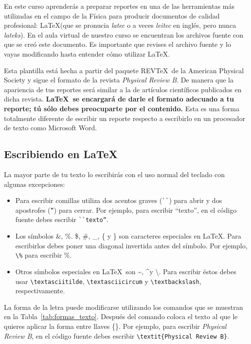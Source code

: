 \documentclass[aps,prb,twocolumn, amsmath, amssymb]{revtex4-2}
\begin{document}
En este curso aprenderás a preparar reportes en una de las herramientas más utilizadas en el campo de la Física para producir documentos de calidad profesional: \LaTeX (que se pronucia \textit{latec} o a veces \textit{leitec} en inglés, pero nunca \textit{lateks}). En el aula virtual de nuestro curso se encuentran los archivos fuente con que se creó este documento. Es importante que revises el archivo fuente y lo vayas modificando hasta entender cómo utilizar \LaTeX.

Esta plantilla está hecha a partir del paquete REV\TeX\ de la American Physical Society y sigue el formato de la revista \textit{Physical Review B}. De manera que la apariencia de tus reportes será similar a la de artículos científicos publicados en dicha revista. \textbf{\LaTeX\ se encargará de darle el formato adecuado a tu reporte; tú sólo debes preocuparte por el contenido.} Esta es una forma totalmente diferente de escribir un reporte respecto a escribirlo en un procesador de texto como Microsoft Word.

\subsection{\label{sec:latex}Escribiendo en \LaTeX}
La mayor parte de tu texto lo escribirás con el uso normal del teclado con algunas excepciones:

\begin{itemize}
	\item Para escribir comillas utiliza dos acentos graves (\texttt{\`}\texttt{\`}) 
	para abrir y dos apostrofes (\texttt{''}) 
	para cerrar. Por ejemplo, para escribir ``texto'', en el código fuente debes escribir \texttt{\`}\texttt{\`}\texttt{texto''}.
	\item Los símbolos \&, \%. \$, \#, \_, \{ y \} 
	son caracteres especiales en \LaTeX. Para escribirlos debes poner una diagonal invertida antes del símbolo. Por ejemplo, \verb|\%| para escribir \%.
	\item Otros símbolos especiales en \LaTeX\ son \textasciitilde, \textasciicircum \space y \textbackslash. Para escribir éstos debes usar \verb|\textasciitilde|, \verb|\textasciicircum| y \verb|\textbackslash|, respectivamente.
\end{itemize}

La forma de la letra puede modificarse utilizando los comandos que se muestran en la Tabla~\ref{tab:formas_texto}. Después del comando coloca el texto al que le quieres aplicar la forma entre llaves \{\}. Por ejemplo, para escribir \textit{Physical Review B}, en el código fuente debes escribir \verb|\textit{Physical Review B}|.
\end{document}
